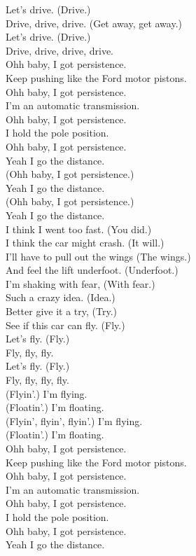 Let's drive. (Drive.) \\
Drive, drive, drive. (Get away, get away.) \\
Let's drive. (Drive.) \\
Drive, drive, drive, drive. \\

Ohh baby, I got persistence. \\
Keep pushing like the Ford motor pistons. \\
Ohh baby, I got persistence. \\
I'm an automatic transmission. \\
Ohh baby, I got persistence. \\
I hold the pole position. \\
Ohh baby, I got persistence. \\
Yeah I go the distance. \\

(Ohh baby, I got persistence.) \\
Yeah I go the distance. \\
(Ohh baby, I got persistence.) \\
Yeah I go the distance. \\

I think I went too fast. (You did.) \\
I think the car might crash. (It will.) \\
I'll have to pull out the wings (The wings.) \\
And feel the lift underfoot. (Underfoot.) \\

I'm shaking with fear, (With fear.) \\
Such a crazy idea. (Idea.) \\
Better give it a try, (Try.) \\
See if this car can fly. (Fly.) \\

Let's fly. (Fly.) \\
Fly, fly, fly. \\
Let's fly. (Fly.) \\
Fly, fly, fly, fly. \\

(Flyin'.) I'm flying. \\
(Floatin'.) I'm floating. \\
(Flyin', flyin', flyin'.) I'm flying. \\
(Floatin'.) I'm floating. \\

Ohh baby, I got persistence. \\
Keep pushing like the Ford motor pistons. \\
Ohh baby, I got persistence. \\
I'm an automatic transmission. \\
Ohh baby, I got persistence. \\
I hold the pole position. \\
Ohh baby, I got persistence. \\
Yeah I go the distance. \\

